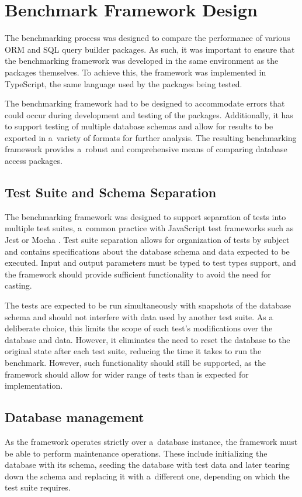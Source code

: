 \chapter{Benchmark Framework Design}

The benchmarking process was designed to compare the performance of various ORM
and SQL query builder packages. As such, it was important to ensure that the
benchmarking framework was developed in the same environment as the packages
themselves. To achieve this, the framework was implemented in TypeScript, the
same language used by the packages being tested.

The benchmarking framework had to be designed to accommodate errors that could
occur during development and testing of the packages. Additionally, it has to
support testing of multiple database schemas and allow for results to be
exported in a~variety of formats for further analysis. The resulting
benchmarking framework provides a~robust and comprehensive means of comparing
database access packages.

\section{Test Suite and Schema Separation}

The benchmarking framework was designed to support separation of tests into
multiple test suites, a~common practice with JavaScript test frameworks such as
Jest \cite{Jest} or Mocha \cite{Mocha}. Test suite separation allows for
organization of tests by subject and contains specifications about the database
schema and data expected to be executed. Input and output parameters must be
typed to test types support, and the framework should provide sufficient
functionality to avoid the need for casting.

The tests are expected to be run simultaneously with snapshots of the database
schema and should not interfere with data used by another test suite. As a
deliberate choice, this limits the scope of each test's modifications over the
database and data. However, it eliminates the need to reset the database to the
original state after each test suite, reducing the time it takes to run the
benchmark. However, such functionality should still be supported, as the
framework should allow for wider range of tests than is expected for
implementation.

\section{Database management}
As the framework operates strictly over a~database instance, the framework must
be able to perform maintenance operations. These include initializing the
database with its schema, seeding the database with test data and later tearing
down the schema and replacing it with a~different one, depending on which the
test suite requires.

